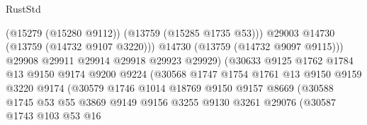 \begin{lexlean}{RustStd}
\begin{coremodule}
                                            (@15279 (@15280 @9112))
                                            (@13759 (@15285 @1735 @53)))
                                          @29003
                                          @14730
                                          (@13759 (@14732 @9107 @3220)))
                                        @14730
                                        (@13759 (@14732 @9097 @9115)))
                                      @29908
                                      @29911
                                      @29914
                                      @29918
                                      @29923
                                      @29929)
                                    (@30633
                                      @9125
                                      @1762
                                      @1784
                                      @13
                                      @9150
                                      @9174
                                      @9200
                                      @9224
                                      (@30568
                                        @1747
                                        @1754
                                        @1761
                                        @13
                                        @9150
                                        @9159
                                        @3220
                                        @9174
                                        (@30579
                                          @1746
                                          @1014
                                          @18769
                                          @9150
                                          @9157
                                          @8669
                                          (@30588
                                            @1745
                                            @53
                                            @55
                                            @3869
                                            @9149
                                            @9156
                                            @3255
                                            @9130
                                            @3261
                                            @29076
                                            (@30587
                                              @1743
                                              @103
                                              @53
                                              @16

\end{coremodule}
\end{lexlean}
